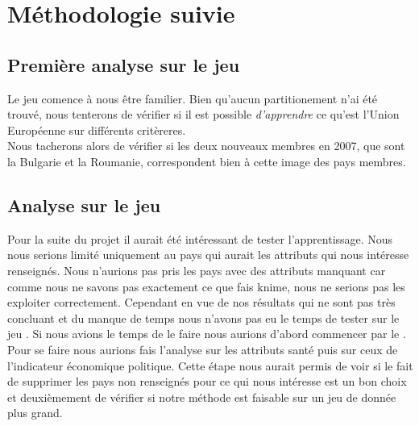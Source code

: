 \section{Méthodologie suivie}

\subsection{Première analyse sur le jeu \jeuc}
Le jeu \jeuc comence à nous être familier. Bien qu'aucun partitionement n'ai été trouvé, nous tenterons de vérifier si il est possible \textit{d'apprendre} ce qu'est l'Union Européenne sur différents critèreres.\\ Nous tacherons alors de vérifier si les deux nouveaux membres en 2007, que sont la Bulgarie et la Roumanie, correspondent bien à cette image des pays membres.

\subsection{Analyse sur le jeu \jeua}
Pour la suite du projet il aurait été intéressant de tester l'apprentissage. Nous nous serions limité uniquement au pays qui aurait les attributs qui nous intéresse renseignés. Nous n'aurions pas pris les pays avec des attributs manquant car comme nous ne savons pas exactement ce que fais knime, nous ne serions pas les exploiter correctement. Cependant en vue de nos résultats qui ne sont pas très concluant et du manque de temps nous n'avons pas eu le temps de tester sur le jeu \jeua . Si nous avions le temps de le faire nous aurions d'abord commencer par le \jeub . Pour se faire nous aurions fais l'analyse sur les attributs santé puis sur ceux de l'indicateur économique politique. Cette étape nous aurait permis de voir si le fait de supprimer les pays non renseignés pour ce qui nous intéresse est un bon choix et deuxièmement de vérifier si notre méthode est faisable sur un jeu de donnée plus grand.



